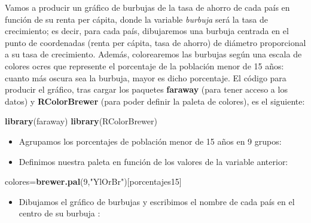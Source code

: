 \documentclass[
]{book}
\newenvironment{Shaded}{\begin{snugshade}}{\end{snugshade}}
\newcommand{\DecValTok}[1]{\textcolor[rgb]{0.00,0.00,0.81}{#1}}
\newcommand{\KeywordTok}[1]{\textcolor[rgb]{0.13,0.29,0.53}{\textbf{#1}}}
\newcommand{\NormalTok}[1]{#1}
\newcommand{\OperatorTok}[1]{\textcolor[rgb]{0.81,0.36,0.00}{\textbf{#1}}}
\newcommand{\StringTok}[1]{\textcolor[rgb]{0.31,0.60,0.02}{#1}}
\providecommand{\tightlist}{%
  \setlength{\itemsep}{0pt}\setlength{\parskip}{0pt}}
\theoremstyle{definition}
\theoremstyle{definition}
\theoremstyle{definition}
\theoremstyle{remark}
\begin{document}
Vamos a producir un gráfico de burbujas de la tasa de ahorro de cada país en función de su renta per cápita, donde la
variable \emph{burbuja} será la tasa de crecimiento; es decir, para cada país, dibujaremos una burbuja centrada en el punto de coordenadas (renta per cápita, tasa de ahorro) de diámetro proporcional a su tasa de crecimiento.
Además, colorearemos las burbujas según una escala de colores ocres que represente el porcentaje de la población menor de 15 años: cuanto más oscura sea la burbuja, mayor es dicho porcentaje. El código para producir el gráfico, tras cargar los paquetes \textbf{faraway} (para tener acceso a los datos) y \textbf{RColorBrewer} (para poder definir la paleta de colores), es el siguiente:

\begin{Shaded}
\begin{Highlighting}[]
\KeywordTok{library}\NormalTok{(faraway)}
\KeywordTok{library}\NormalTok{(RColorBrewer)}
\end{Highlighting}
\end{Shaded}

\begin{itemize}
\tightlist
\item
  Agrupamos los porcentajes de población menor de 15 años en 9 grupos:
\end{itemize}

\begin{Shaded}
\end{Shaded}

\begin{itemize}
\tightlist
\item
  Definimos nuestra paleta en función de los valores de la variable anterior:
\end{itemize}

\begin{Shaded}
\begin{Highlighting}[]
\NormalTok{colores=}\KeywordTok{brewer.pal}\NormalTok{(}\DecValTok{9}\NormalTok{,}\StringTok{"YlOrBr"}\NormalTok{)[porcentajes15]}
\end{Highlighting}
\end{Shaded}

\begin{itemize}
\tightlist
\item
  Dibujamos el gráfico de burbujas y escribimos el nombre de cada país en el centro de su burbuja :
\end{itemize}
\end{document}
